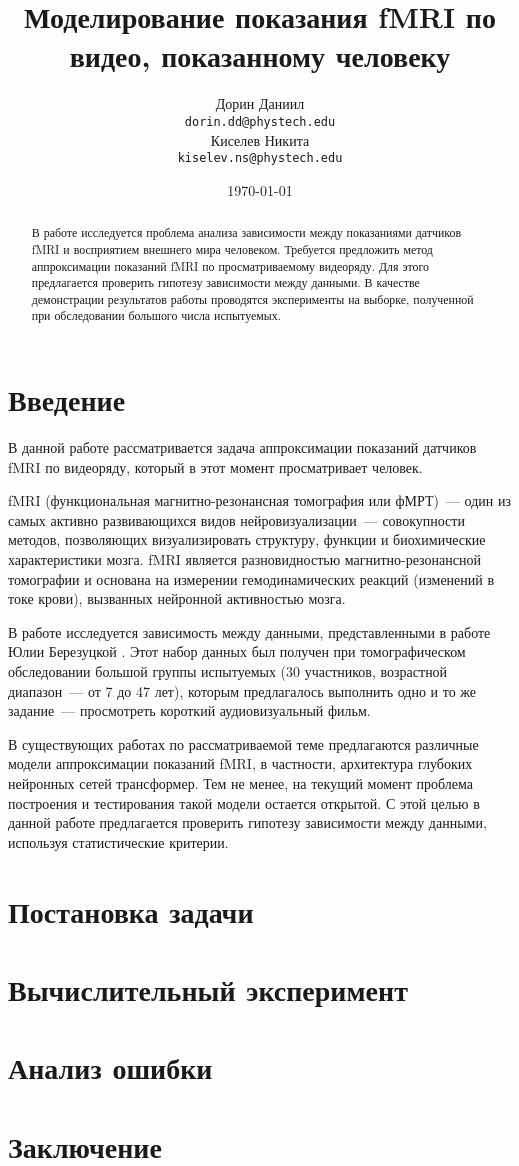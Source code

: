 \documentclass[a4paper, 12pt]{article}
\title{Моделирование показания fMRI по видео, показанному человеку}
\author{
	Дорин Даниил \\
	\texttt{dorin.dd@phystech.edu} \\
	\And
	Киселев Никита \\
	\texttt{kiselev.ns@phystech.edu} \\
}
\date{\today}
\begin{document}
\maketitle

\begin{abstract}
	
	В работе исследуется проблема анализа зависимости между показаниями датчиков fMRI
	и восприятием внешнего мира человеком. 
	Требуется предложить метод аппроксимации показаний fMRI по просматриваемому видеоряду.
	Для этого предлагается проверить гипотезу зависимости между данными.
	В качестве демонстрации результатов работы проводятся эксперименты на выборке, полученной
	при обследовании большого числа испытуемых.

\end{abstract}



\section{Введение}

	В данной работе рассматривается задача аппроксимации показаний датчиков fMRI по видеоряду,
	который в этот момент просматривает человек. 
	
	fMRI (функциональная магнитно-резонансная томография или фМРТ)~--- один из самых
	активно развивающихся видов нейровизуализации~--- совокупности методов, позволяющих 
	визуализировать структуру, функции и биохимические характеристики мозга. fMRI является
	разновидностью магнитно-резонансной томографии и основана на измерении гемодинамических
	реакций (изменений в токе крови), вызванных нейронной активностью мозга.

	В работе исследуется зависимость между данными, представленными в работе Юлии Березуцкой 
	\citep{Berezutskaya2022}. Этот набор данных был получен при томографическом
	обследовании большой группы испытуемых (30 участников, возрастной диапазон~--- от 7 до 47 лет),
	которым предлагалось выполнить одно и то же задание~--- просмотреть короткий аудиовизуальный
	фильм. 
	
	В существующих работах по рассматриваемой теме предлагаются различные модели аппроксимации 
	показаний fMRI, в частности, архитектура глубоких нейронных сетей трансформер. Тем не менее,
	на текущий момент проблема построения и тестирования такой модели остается открытой.
	С этой целью в данной работе предлагается проверить гипотезу зависимости между данными, 
	используя статистические критерии.  

\section{Постановка задачи}

\section{Вычислительный эксперимент}

\section{Анализ ошибки}

\section{Заключение}



\end{document}
